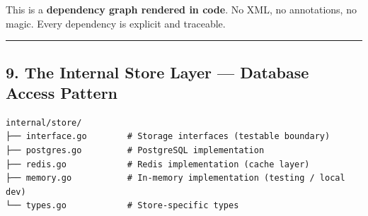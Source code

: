 \documentclass[
]{article}
\begin{document}
This is a \textbf{dependency graph rendered in code}. No XML, no
annotations, no magic. Every dependency is explicit and traceable.

\begin{center}\rule{0.5\linewidth}{0.5pt}\end{center}

\hypertarget{the-internal-store-layer-database-access-pattern}{%
\subsection{9. The Internal Store Layer --- Database Access
Pattern}\label{the-internal-store-layer-database-access-pattern}}

\begin{verbatim}
internal/store/
├── interface.go        # Storage interfaces (testable boundary)
├── postgres.go         # PostgreSQL implementation
├── redis.go            # Redis implementation (cache layer)
├── memory.go           # In-memory implementation (testing / local dev)
└── types.go            # Store-specific types
\end{verbatim}
\end{document}
